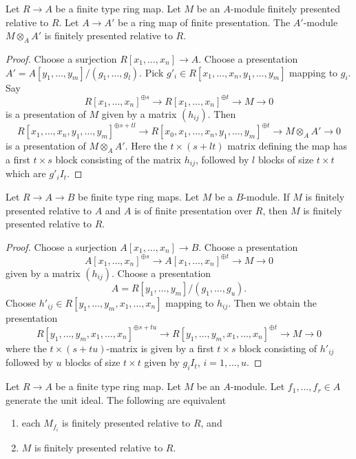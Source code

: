 \begin{lemma}
\label{lemma-pull-relative-finite-presentation}
Let $R \to A$ be a finite type ring map.
Let $M$ be an $A$-module finitely presented relative to $R$.
Let $A \to A'$ be a ring map of finite presentation.
The $A'$-module $M \otimes_A A'$ is finitely presented relative to $R$.
\end{lemma}

\begin{proof}
Choose a surjection $R[x_1, \ldots, x_n] \to A$. Choose a presentation
$A' = A[y_1, \ldots, y_m]/(g_1, \ldots, g_l)$.
Pick $g'_i \in R[x_1, \ldots, x_n, y_1, \ldots, y_m]$ mapping to $g_i$.
Say
$$
R[x_1, \ldots, x_n]^{\oplus s} \to
R[x_1, \ldots, x_n]^{\oplus t} \to M \to 0
$$
is a presentation of $M$ given by a matrix $(h_{ij})$.
Then
$$
R[x_1, \ldots, x_n, y_1, \ldots, y_m]^{\oplus s + tl} \to
R[x_0, x_1, \ldots, x_n, y_1, \ldots, y_m]^{\oplus t} \to M \otimes_A A' \to 0
$$
is a presentation of $M \otimes_A A'$.
Here the $t \times (s + lt)$ matrix defining the map has a first
$t \times s$ block consisting of the matrix $h_{ij}$, followed
by $l$ blocks of size $t \times t$ which are $g'_iI_t$.
\end{proof}

\begin{lemma}
\label{lemma-composition-relative-finite-presentation}
Let $R \to A \to B$ be finite type ring maps. Let $M$ be a $B$-module.
If $M$ is finitely presented relative to $A$ and $A$ is of finite presentation
over $R$, then $M$ is finitely presented relative to $R$.
\end{lemma}

\begin{proof}
Choose a surjection $A[x_1, \ldots, x_n] \to B$.
Choose a presentation
$$
A[x_1, \ldots, x_n]^{\oplus s} \to
A[x_1, \ldots, x_n]^{\oplus t} \to M \to 0
$$
given by a matrix $(h_{ij})$. Choose a presentation
$$
A = R[y_1, \ldots, y_m]/(g_1, \ldots, g_u).
$$
Choose $h'_{ij} \in R[y_1, \ldots, y_m, x_1, \ldots, x_n]$
mapping to $h_{ij}$. Then we obtain the presentation
$$
R[y_1, \ldots, y_m, x_1, \ldots, x_n]^{\oplus s + tu} \to
R[y_1, \ldots, y_m, x_1, \ldots, x_n]^{\oplus t} \to M \to 0
$$
where the $t \times (s + tu)$-matrix is given by a first $t \times s$ block
consisting of $h'_{ij}$ followed by $u$ blocks of size $t \times t$ given
by $g_iI_t$, $i = 1, \ldots, u$.
\end{proof}

\begin{lemma}
\label{lemma-glue-relative-finite-presentation}
Let $R \to A$ be a finite type ring map. Let $M$ be an $A$-module.
Let $f_1, \ldots, f_r \in A$ generate the unit ideal.
The following are equivalent
\begin{enumerate}
\item each $M_{f_i}$ is finitely presented relative to $R$, and
\item $M$ is finitely presented relative to $R$.
\end{enumerate}
\end{lemma}

